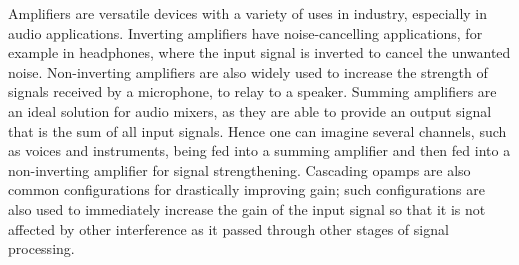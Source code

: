\documentclass[journal]{IEEEtran}
\begin{document}
\noindent Amplifiers are versatile devices with a variety of uses in industry, especially in audio applications. Inverting amplifiers have noise-cancelling applications, for example in headphones, where the input signal is inverted to cancel the unwanted noise. Non-inverting amplifiers are also widely used to increase the strength of signals received by a microphone, to relay to a speaker. Summing amplifiers are an ideal solution for audio mixers, as they are able to provide an output signal that is the sum of all input signals. Hence one can imagine several channels, such as voices and instruments, being fed into a summing amplifier and then fed into a non-inverting amplifier for signal strengthening. Cascading opamps are also common configurations for drastically improving gain; such configurations are also used to immediately increase the gain of the input signal so that it is not affected by other interference as it passed through other stages of signal processing. 

\printbibliography
\end{document}

